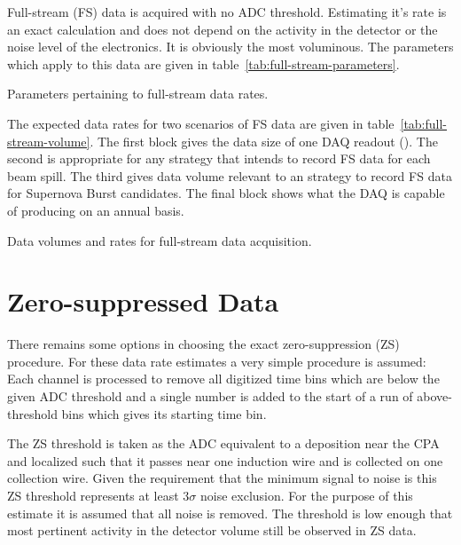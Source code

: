 Full-stream (FS) data is acquired with no ADC threshold.
Estimating it's rate is an exact calculation and does not depend on
the activity in the detector or the noise level of the electronics.
It is obviously the most voluminous.
The parameters which apply to this data are given in table~\ref{tab:full-stream-parameters}.

\begin{table}[htbp]
  \centering
  \caption{Parameters pertaining to full-stream data rates.}
  
  \label{tab:full-stream-parameters}
\end{table}

The expected data rates for two scenarios of FS data are given
in table~\ref{tab:full-stream-volume}.
The first block gives the data size of one DAQ readout
(\daqreadouttime).
The second is appropriate for any strategy that intends to record FS
data for each beam spill.
The third gives data volume relevant to an strategy to record FS data
for Supernova Burst candidates.
The final block shows what the DAQ is capable of producing on an annual basis.


\begin{table}[htbp]
  \centering
  \caption{Data volumes and rates for full-stream data
    acquisition.}
  
  \label{tab:full-stream-volume}
\end{table}

\section{Zero-suppressed Data}

There remains some options in choosing the exact zero-suppression (ZS) procedure.
For these data rate estimates a very simple procedure is assumed: Each
channel is processed to remove all digitized time bins which are below
the given ADC threshold and a single number is added to the start of a
run of above-threshold bins which gives its starting time bin.

The ZS threshold is taken as the ADC equivalent to a
\chargezsthreshold
deposition near the CPA and localized such that it passes near one
induction wire and is collected on one collection wire.
Given the requirement that the minimum signal to noise is
\chargeminsignalnoiseratio this ZS threshold represents at least $3\sigma$
noise exclusion.
For the purpose of this estimate it is assumed that all noise is
removed.
The threshold is low enough that most pertinent activity in the
detector volume still be observed in ZS data.


